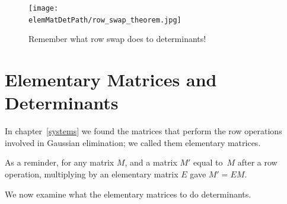 \begin{figure}
\begin{center}
\texttt{[image: \\elemMatDetPath/row\_swap\_theorem.jpg]}
\end{center}
\caption{Remember what row swap does to determinants!}
\end{figure}

\section{Elementary Matrices and Determinants}

In chapter~\ref{systems} we found
the matrices that perform the  row operations involved in Gaussian elimination; we called them elementary matrices.

As a reminder, for any matrix $M$, and a matrix $M'$ equal to~$M$ after a row operation, multiplying by an elementary matrix $E$ gave $M'=EM$.


We now examine what the elementary matrices to do determinants.

